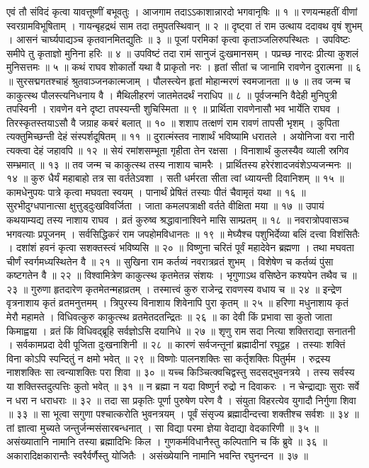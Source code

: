 एवं तौ संविदं कृत्वा यावत्तूष्णीं बभूवतुः ।
आजगाम तदाऽऽकाशान्नारदो भगवानृषिः ॥ १ ॥
रणयन्महतीं वीणां स्वरग्रामविभूषिताम् ।
गायन्बृहद्रथं साम तदा तमुपतस्थिवान् ॥ २ ॥
दृष्ट्वा तं राम उत्थाय ददावथ वृषं शुभम् ।
आसनं चार्घ्यपाद्यञ्च कृतवानमितद्युतिः ॥ ३ ॥
पूजां परमिकां कृत्वा कृताञ्जलिरुपस्थितः ।
उपविष्टः समीपे तु कृताज्ञो मुनिना हरिः ॥ ४ ॥
उपविष्टं तदा रामं सानुजं दुःखमानसम् ।
पप्रच्छ नारदः प्रीत्या कुशलं मुनिसत्तमः ॥ ५ ॥
कथं राघव शोकार्तो यथा वै प्राकृतो नरः ।
हृतां सीतां च जानामि रावणेन दुरात्मना ॥ ६ ॥
सुरसद्मगतश्चाहं श्रुतवाञ्जनकात्मजाम् ।
पौलस्त्येन हृतां मोहान्मरणं स्वमजानता ॥ ७ ॥
तव जन्म च काकुत्स्थ पौलस्त्यनिधनाय वै ।
मैथिलीहरणं जातमेतदर्थं नराधिप ॥ ८ ॥
पूर्वजन्मनि वैदेही मुनिपुत्री तपस्विनी ।
रावणेन वने दृष्टा तपस्यन्ती शुचिस्मिता ॥ ९ ॥
प्रार्थिता रावणेनासौ भव भार्येति राघव ।
तिरस्कृतस्तयाऽसौ वै जग्राह कबरं बलात् ॥ १० ॥
शशाप तत्क्षणं राम रावणं तापसी भृशम् ।
कुपिता त्यक्तुमिच्छन्ती देहं संस्पर्शदूषितम् ॥ ११ ॥
दुरात्मंस्तव नाशार्थं भविष्यामि धरातले ।
अयोनिजा वरा नारी त्यक्त्वा देहं जहावपि ॥ १२ ॥
सेयं रमांशसम्भूता गृहीता तेन रक्षसा ।
विनाशार्थं कुलस्यैव व्याली स्रगिव सम्भ्रमात् ॥ १३ ॥
तव जन्म च काकुत्स्थ तस्य नाशाय चामरैः ।
प्रार्थितस्य हरेरंशादजवंशेऽप्यजन्मनः ॥ १४ ॥
कुरु धैर्यं महाबाहो तत्र सा वर्ततेऽवशा ।
सती धर्मरता सीता त्वां ध्यायन्ती दिवानिशम् ॥ १५ ॥
कामधेनुपयः पात्रे कृत्वा मघवता स्वयम् ।
पानार्थं प्रेषितं तस्याः पीतं चैवामृतं यथा ॥ १६ ॥
सुरभीदुग्धपानात्सा क्षुत्तुड्‌दुःखविवर्जिता ।
जाता कमलपत्राक्षी वर्तते वीक्षिता मया ॥ १७ ॥
उपायं कथयाम्यद्य तस्य नाशाय राघव ।
व्रतं कुरुष्व श्रद्धावानाश्विने मासि साम्प्रतम् ॥ १८ ॥
नवरात्रोपवासञ्च भगवत्याः प्रपूजनम् ।
सर्वसिद्धिकरं राम जपहोमविधानतः ॥ १९ ॥
मेघ्यैश्च पशुभिर्देव्या बलिं दत्त्वा विशंसितैः ।
दशांशं हवनं कृत्वा सशक्तस्त्वं भविष्यसि ॥ २० ॥
विष्णुना चरितं पूर्वं महादेवेन ब्रह्मणा ।
तथा मघवता चीर्णं स्वर्गमध्यस्थितेन वै ॥ २१ ॥
सुखिना राम कर्तव्यं नवरात्रव्रतं शुभम् ।
विशेषेण च कर्तव्यं पुंसा कष्टगतेन वै ॥ २२ ॥
विश्वामित्रेण काकुत्स्थ कृतमेतन्न संशयः ।
भृगुणाऽथ वसिष्ठेन कश्यपेन तथैव च ॥ २३ ॥
गुरुणा हृतदारेण कृतमेतन्महाव्रतम् ।
तस्मात्त्वं कुरु राजेन्द्र रावणस्य वधाय च ॥ २४ ॥
इन्द्रेण वृत्रनाशाय कृतं व्रतमनुत्तमम् ।
त्रिपुरस्य विनाशाय शिवेनापि पुरा कृतम् ॥ २५ ॥
हरिणा मधुनाशाय कृतं मेरौ महामते ।
विधिवत्कुरु काकुत्स्थ व्रतमेतदतन्द्रितः ॥ २६ ॥
का देवी किं प्रभावा सा कुतो जाता किमाह्वया ।
व्रतं किं विधिवद्‌ब्रूहि सर्वज्ञोऽसि दयानिधे ॥ २७ ॥
शृणु राम सदा नित्या शक्तिराद्या सनातनी ।
सर्वकामप्रदा देवी पूजिता दुःखनाशिनी ॥ २८ ॥
कारणं सर्वजन्तूनां ब्रह्मादीनां रघूद्वह ।
तस्याः शक्तिं विना कोऽपि स्पन्दितुं न क्षमो भवेत् ॥ २९ ॥
विष्णोः पालनशक्तिः सा कर्तृशक्तिः पितुर्मम ।
रुद्रस्य नाशशक्तिः सा त्वन्याशक्तिः परा शिवा ॥ ३० ॥
यच्च किञ्चित्क्वचिद्वस्तु सदसद्‌भुवनत्रये ।
तस्य सर्वस्य या शक्तिस्तदुत्पत्तिः कुतो भवेत् ॥ ३१ ॥
न ब्रह्मा न यदा विष्णुर्न रुद्रो न दिवाकरः ।
न चेन्द्राद्याः सुराः सर्वे न धरा न धराधराः ॥ ३२ ॥
तदा सा प्रकृतिः पूर्णा पुरुषेण परेण वै ।
संयुता विहरत्येव युगादौ निर्गुणा शिवा ॥ ३३ ॥
सा भूत्वा सगुणा पश्चात्करोति भुवनत्रयम् ।
पूर्वं संसृज्य ब्रह्मादीन्दत्त्वा शक्तीश्च सर्वशः ॥ ३४ ॥
तां ज्ञात्वा मुच्यते जन्तुर्जन्मसंसारबन्धनात् ।
सा विद्या परमा ज्ञेया वेदाद्या वेदकारिणी ॥ ३५ ॥
असंख्यातानि नामानि तस्या ब्रह्मादिभिः किल ।
गुणकर्मविधानैस्तु कल्पितानि च किं ब्रुवे ॥ ३६ ॥
अकारादिक्षकारान्तैः स्वरैर्वर्णैस्तु योजितैः ।
असंख्येयानि नामानि भवन्ति रघुनन्दन ॥ ३७ ॥

